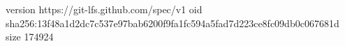 version https://git-lfs.github.com/spec/v1
oid sha256:13f48a1d2dc7c537e97bab6200f9fa1fc594a5fad7d223ce8fc09db0c067681d
size 174924
